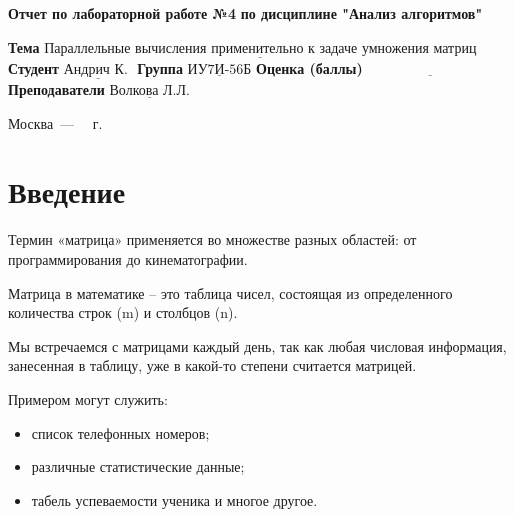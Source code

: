 \documentclass[12pt]{report}
\begin{document}
\begin{titlepage}
	
	\begin{center}
		\noindent\begin{minipage}{1.3\textwidth}\centering
			\Large\textbf{  Отчет по лабораторной работе №4}\newline
			\textbf{по дисциплине "Анализ алгоритмов"}\newline\newline
		\end{minipage}
	\end{center}
	
	\noindent\textbf{Тема} $\underline{\text{Параллельные вычисления применительно к задаче умножения матриц}}$\newline\newline
	\noindent\textbf{Студент} $\underline{\text{Андрич К. }}$\newline\newline
	\noindent\textbf{Группа} $\underline{\text{ИУ7И-56Б}}$\newline\newline
	\noindent\textbf{Оценка (баллы)} $\underline{\text{~~~~~~~~~~~~~~~~~~~~~~~~~~~}}$\newline\newline
	\noindent\textbf{Преподаватели} $\underline{\text{Волкова Л.Л.}}$\newline\newline\newline
	
	\begin{center}
		\vfill
		Москва~---~\the\year
		~г.
	\end{center}
\end{titlepage}


\tableofcontents

\newpage
\chapter*{Введение}
Термин «матрица» применяется во множестве разных областей: от программирования до кинематографии.

Матрица в математике – это таблица чисел, состоящая из определенного количества строк (m) и столбцов (n).

Мы встречаемся с матрицами каждый день, так как любая числовая информация, занесенная в таблицу, уже в какой-то степени считается матрицей.

Примером могут служить:

\begin{itemize}
	\item список телефонных номеров;
	\item различные статистические данные;
	\item табель успеваемости ученика и многое другое.
\end{itemize}
\end{document}
